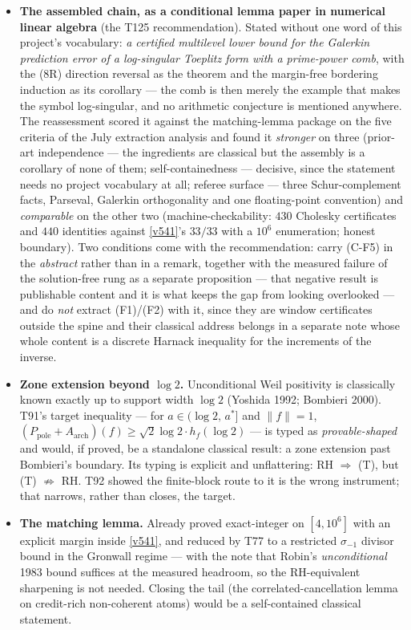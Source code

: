 \documentclass[11pt,a4paper]{article}
\begin{document}
\begin{itemize}[leftmargin=1.5em]
\item \textbf{The assembled chain, as a conditional lemma paper in numerical linear algebra} (the
T125 recommendation). Stated without one word of this project's vocabulary: \emph{a certified
multilevel lower bound for the Galerkin prediction error of a log-singular Toeplitz form with a
prime-power comb}, with the (8R) direction reversal as the theorem and the margin-free bordering
induction as its corollary --- the comb is then merely the example that makes the symbol
log-singular, and no arithmetic conjecture is mentioned anywhere. The reassessment scored it against
the matching-lemma package on the five criteria of the July extraction analysis and found it
\emph{stronger} on three (prior-art independence --- the ingredients are classical but the assembly
is a corollary of none of them; self-containedness --- decisive, since the statement needs no project
vocabulary at all; referee surface --- three Schur-complement facts, Parseval, Galerkin orthogonality
and one floating-point convention) and \emph{comparable} on the other two (machine-checkability:
$430$ Cholesky certificates and $440$ identities against \vref{v541}'s $33/33$ with a $10^6$
enumeration; honest boundary). Two conditions come with the recommendation: carry (C-F5) in the
\emph{abstract} rather than in a remark, together with the measured failure of the solution-free rung
as a separate proposition --- that negative result is publishable content and it is what keeps the gap
from looking overlooked --- and do \emph{not} extract (F1)/(F2) with it, since they are window
certificates outside the spine and their classical address belongs in a separate note whose whole
content is a discrete Harnack inequality for the increments of the inverse.
\item \textbf{Zone extension beyond $\log2$.} Unconditional Weil positivity is classically known exactly
up to support width $\log2$ (Yoshida 1992; Bombieri 2000). T91's target inequality --- for
$a\in(\log2,\,a^*]$ and $\|f\|=1$, \ $(P_{\mathrm{pole}}+A_{\mathrm{arch}})(f)\ge\sqrt2\log2\cdot h_f(\log2)$
--- is typed as \emph{provable-shaped} and would, if proved, be a standalone classical result: a zone
extension past Bombieri's boundary. Its typing is explicit and unflattering: RH $\Rightarrow$ (T), but
(T) $\not\Rightarrow$ RH. T92 showed the finite-block route to it is the wrong instrument; that
narrows, rather than closes, the target.
\item \textbf{The matching lemma.} Already proved exact-integer on $[4,10^6]$ with an explicit margin
inside \vref{v541}, and reduced by T77 to a restricted $\sigma_{-1}$ divisor bound in the Gronwall
regime --- with the note that Robin's \emph{unconditional} 1983 bound suffices at the measured
headroom, so the RH-equivalent sharpening is not needed. Closing the tail (the correlated-cancellation
lemma on credit-rich non-coherent atoms) would be a self-contained classical statement.
\end{itemize}
\end{document}
